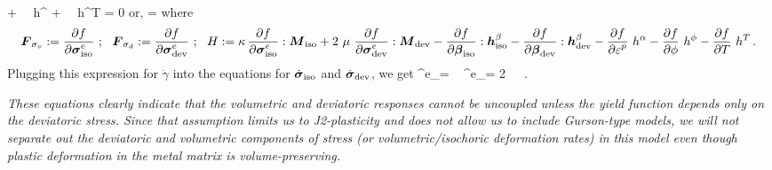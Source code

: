     + \dot{\gamma}~~h^{\phi}
    + \dot{\gamma}~~h^{T}  = 0
\Eeq
or,
\Beq
  \dot{\gamma} = 
\Eeq
where 
\[
  \BF_{\sigma_v} := \Partial{f}{\Bsig^e_\Tiso} ~;~~
  \BF_{\sigma_d} := \Partial{f}{\Bsig^e_\Tdev} ~;~~
  H := \kappa\,\Partial{f}{\Bsig^e_\Tiso}:\BM_\Tiso + 2~\mu~\Partial{f}{\Bsig^e_\Tdev}:\BM_\Tdev 
     - \Partial{f}{\Bbeta_\Tiso}:\Bh^{\beta}_\Tiso
     - \Partial{f}{\Bbeta_\Tdev}:\Bh^{\beta}_\Tdev
     - \Partial{f}{\Ve^p}~h^{\alpha} - \Partial{f}{\phi}~h^{\phi}
     - \Partial{f}{T}~h^{T} \,.
\]
Plugging this expression for $\dot{\gamma}$ into the equations for
$\dot{\Bsig}_\Tiso$ and $\dot{\Bsig}_\Tdev$, we get
\Beq
  \dot{\Bsig}^e_\Tiso = \kappa~ 
  \quad
  \dot{\Bsig}^e_\Tdev = 2~\mu~~.
\Eeq

\textit{These equations clearly indicate that the volumetric and deviatoric responses cannot be
uncoupled unless the yield function depends only on the deviatoric stress. Since that assumption
limits us to J2-plasticity and does not allow us to include Gurson-type models, we will not separate
out the deviatoric and volumetric components of stress (or volumetric/isochoric deformation rates) 
in this model even though plastic deformation in the metal matrix is volume-preserving.}


